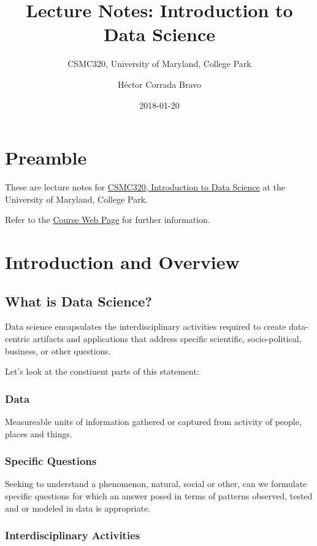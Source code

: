 \documentclass[12pt,]{book}
\title{Lecture Notes: Introduction to Data Science}
\subtitle{CSMC320, University of Maryland, College Park}
\author{Héctor Corrada Bravo}
\date{2018-01-20}
\theoremstyle{definition}
\theoremstyle{definition}
\theoremstyle{definition}
\theoremstyle{remark}
\begin{document}
\maketitle

{
\setcounter{tocdepth}{2}
\tableofcontents
}
\chapter{Preamble}\label{preamble}

These are lecture notes for \href{/}{CSMC320, Introduction to Data
Science} at the University of Maryland, College Park.

Refer to the \href{/}{Course Web Page} for further information.

\chapter{Introduction and Overview}\label{introduction-and-overview}

\section{What is Data Science?}\label{what-is-data-science}

Data science encapsulates the interdisciplinary activities required to
create data-centric artifacts and applications that address specific
scientific, socio-political, business, or other questions.

Let's look at the constiuent parts of this statement:

\subsection{Data}\label{data}

Measureable units of information gathered or captured from activity of
people, places and things.

\subsection{Specific Questions}\label{specific-questions}

Seeking to understand a phenomenon, natural, social or other, can we
formulate specific questions for which an answer posed in terms of
patterns observed, tested and or modeled in data is appropriate.

\subsection{Interdisciplinary
Activities}\label{interdisciplinary-activities}
\end{document}
